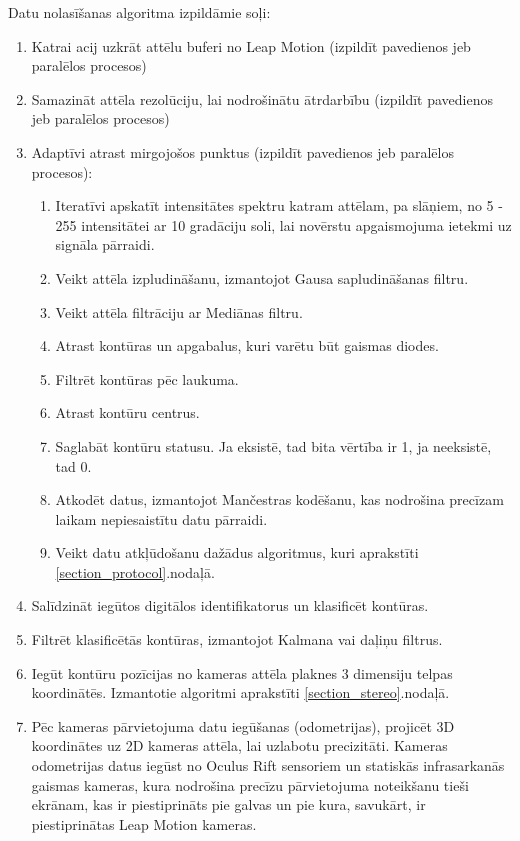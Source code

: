 \documentclass[12pt, a4paper, oneside, openright]{article}
\begin{document}
Datu nolasīšanas algoritma izpildāmie soļi:
\begin{enumerate}

\item Katrai acij uzkrāt attēlu buferi no Leap Motion (izpildīt pavedienos jeb paralēlos procesos)
\item Samazināt attēla rezolūciju, lai nodrošinātu ātrdarbību (izpildīt pavedienos jeb paralēlos procesos)
\item Adaptīvi atrast mirgojošos punktus (izpildīt pavedienos jeb paralēlos procesos):
\begin{enumerate}
\item Iteratīvi apskatīt intensitātes spektru katram attēlam, pa slāņiem, no 5 - 255 intensitātei ar 10 gradāciju soli,
lai novērstu apgaismojuma ietekmi uz signāla pārraidi.
\item Veikt attēla izpludināšanu, izmantojot Gausa sapludināšanas filtru.
\item Veikt attēla filtrāciju ar Mediānas filtru.
\item Atrast kontūras un apgabalus, kuri varētu būt gaismas diodes.
\item Filtrēt kontūras pēc laukuma.
\item Atrast kontūru centrus.
\item Saglabāt kontūru statusu. Ja eksistē, tad bita vērtība ir 1, ja neeksistē, tad 0.
\item Atkodēt datus, izmantojot Mančestras kodēšanu, kas nodrošina precīzam laikam nepiesaistītu datu pārraidi.
\item Veikt datu atkļūdošanu dažādus algoritmus, kuri aprakstīti \ref{section_protocol}.nodaļā.
\end{enumerate}
\item Salīdzināt iegūtos digitālos identifikatorus un klasificēt kontūras. 
\item Filtrēt klasificētās kontūras, izmantojot Kalmana vai daļiņu filtrus.
\item Iegūt kontūru pozīcijas no kameras attēla plaknes 3 dimensiju telpas koordinātēs. Izmantotie algoritmi aprakstīti \ref{section_stereo}.nodaļā.
\item Pēc kameras pārvietojuma datu iegūšanas (odometrijas), projicēt 3D koordinātes uz 
2D kameras attēla, lai uzlabotu precizitāti. Kameras odometrijas datus iegūst no Oculus Rift sensoriem un statiskās infrasarkanās gaismas kameras, kura nodrošina precīzu pārvietojuma noteikšanu tieši ekrānam, kas ir piestiprināts pie galvas
un pie kura, savukārt, ir piestiprinātas Leap Motion kameras.

\end{enumerate}
\end{document}
